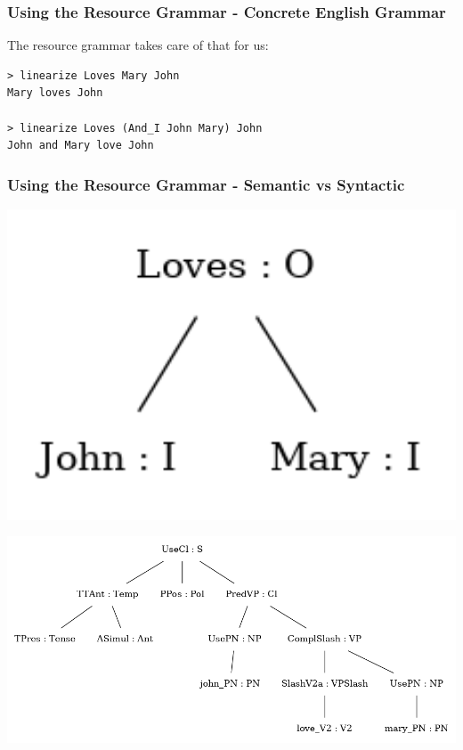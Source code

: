 \documentclass{beamer}
\begin{document}
\begin{frame}[fragile]
    \frametitle{Using the Resource Grammar - Concrete English Grammar}

    

    \vspace{1em}
    The resource grammar takes care of that for us:
\begin{lstlisting}[language=GFcmd, breaklines=true]
> linearize Loves Mary John
Mary loves John

> linearize Loves (And_I John Mary) John
John and Mary love John
\end{lstlisting}
\end{frame}

\begin{frame}[fragile]
    \frametitle{Using the Resource Grammar - Semantic vs Syntactic}
    \begin{minipage}{0.31\textwidth}
        \includegraphics[width=1.1\textwidth]{jlm_sem.png}
    \end{minipage}
    \begin{minipage}{0.64\textwidth}
        \includegraphics[width=1.1\textwidth]{jlm_syn.png}
    \end{minipage}


\end{frame}
\end{document}
